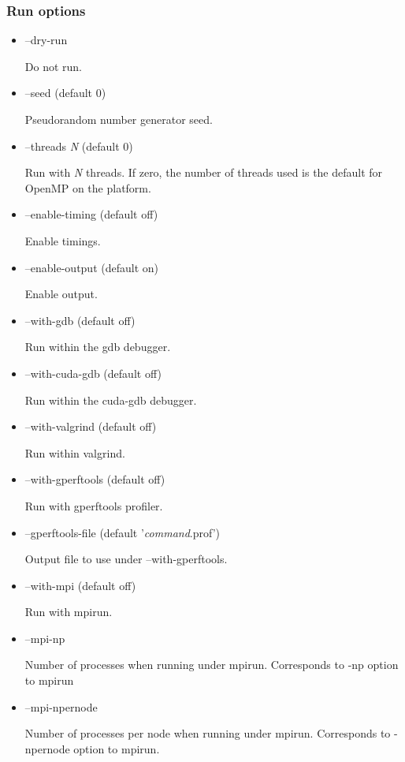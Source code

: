 \subsubsection{Run options}
\begin{itemize}
\item {\sf --dry-run}

Do not run.

\item {\sf --seed} (default 0)

Pseudorandom number generator seed.

\item {\sf --threads \textsl{N}} (default 0)

Run with {\sf \textsl{N}} threads. If zero, the number of threads used is the
default for OpenMP on the platform.

\item {\sf --enable-timing} (default off)

Enable timings.

\item {\sf --enable-output} (default on)

Enable output.

\item {\sf --with-gdb} (default off)

Run within the {\sf gdb} debugger.

\item {\sf --with-cuda-gdb} (default off)

Run within the {\sf cuda-gdb} debugger.

\item {\sf --with-valgrind} (default off)

Run within {\sf valgrind}.

\item {\sf --with-gperftools} (default off)

Run with {\sf gperftools} profiler.

\item {\sf --gperftools-file} (default '\textsl{command}.prof')

Output file to use under {\sf --with-gperftools}.

\item {\sf --with-mpi} (default off)

Run with {\sf mpirun}.

\item {\sf --mpi-np}

Number of processes when running under {\sf mpirun}. Corresponds to {\sf -np}
option to {\sf mpirun}

\item {\sf --mpi-npernode}

Number of processes per node when running under {\sf mpirun}. Corresponds to
{\sf -npernode} option to {\sf mpirun}.

\end{itemize}

